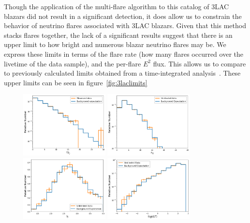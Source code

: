 Though the application of the multi-flare algorithm to this catalog of 3LAC blazars did not result in a significant detection, it does allow us to constrain the behavior of neutrino flares associated with 3LAC blazars. Given that this method stacks flares together, the lack of a significant results suggest that there is an upper limit to how bright and numerous blazar neutrino flares may be. We express these limits in terms of the flare rate (how many flares occurred over the livetime of the data sample), and the per-flare $E^2$ flux. This allows us to compare to previously calculated limits obtained from a time-integrated analysis~\cite{2lac_ic}. These upper limits can be seen in figure~\ref{fig:3laclimits}

\begin{figure}[h]
\centering
\includegraphics[width=0.4\textwidth]{figs/3lac_tsjs.png}
\includegraphics[width=0.4\textwidth]{figs/3lac_nss.png}
\includegraphics[width=0.4\textwidth]{figs/3lac_gammas.png}
\includegraphics[width=0.4\textwidth]{figs/3lac_dts.png}

\end{figure}
